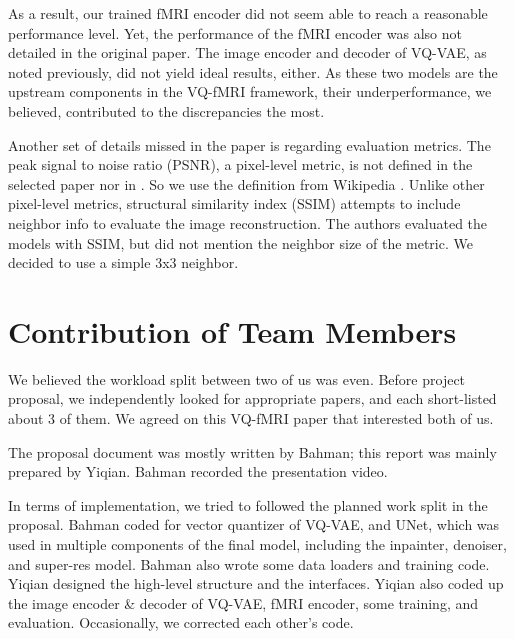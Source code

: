 \documentclass{article}
\theoremstyle{plain}
\theoremstyle{definition}
\theoremstyle{remark}
\begin{document}
As a result, our trained fMRI encoder did not seem able to reach a reasonable performance level. Yet, the performance of the fMRI encoder was also not detailed in the original paper. The image encoder and decoder of VQ-VAE, as noted previously, did not yield ideal results, either. As these two models are the upstream components in the VQ-fMRI framework, their underperformance, we believed, contributed to the discrepancies the most.

Another set of details missed in the paper is regarding evaluation metrics. The peak signal to noise ratio (PSNR), a pixel-level metric, is not defined in the selected paper nor in \cite{rakhimberdina2021natural}. So we use the definition from Wikipedia \cite{wiki:psnr}. Unlike other pixel-level metrics, structural similarity index (SSIM) attempts to include neighbor info to evaluate the image reconstruction. The authors evaluated the models with SSIM, but did not mention the neighbor size of the metric. We decided to use a simple 3x3 neighbor.






\section{Contribution of Team Members}
We believed the workload split between two of us was even. Before project proposal, we independently looked for appropriate papers, and each short-listed about 3 of them. We agreed on this VQ-fMRI paper that interested both of us.

The proposal document was mostly written by Bahman; this report was mainly prepared by Yiqian. Bahman recorded the presentation video.

In terms of implementation, we tried to followed the planned work split in the proposal. Bahman coded for vector quantizer of VQ-VAE, and UNet, which was used in multiple components of the final model, including the inpainter, denoiser, and super-res model. Bahman also wrote some data loaders and training code. Yiqian designed the high-level structure and the interfaces. Yiqian also coded up the image encoder \& decoder of VQ-VAE, fMRI encoder, some training, and evaluation. Occasionally, we corrected each other's code.
\end{document}
